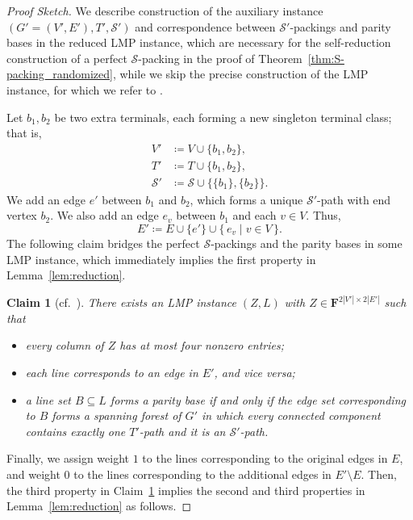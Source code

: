 \documentclass[11pt, a4paper]{article}
\theoremstyle{plain}
\newtheorem{claim}[theorem]{Claim}
\theoremstyle{definition}
\theoremstyle{remark}
\newcommand{\cS}{\mathcal{S}}
\newcommand{\bF}{\mathbf{F}}
\begin{document}
\begin{proof}[Proof Sketch]
We describe construction of the auxiliary instance $(G' = (V', E'), T', \cS')$ and correspondence between $\cS'$-packings and parity bases in the reduced LMP instance, which are necessary for the self-reduction construction of a perfect $\cS$-packing in the proof of Theorem~\ref{thm:S-packing_randomized}, while we skip the precise construction of the LMP instance, for which we refer to \cite[Section~2.1]{Yamaguchi2016}.

Let $b_1, b_2$ be two extra terminals, each forming a new singleton terminal class; that is,
\begin{align*}
    V' &\coloneqq V \cup \{b_1, b_2\},\\
    T' &\coloneqq T \cup \{b_1, b_2\},\\
    \cS' &\coloneqq \cS \cup \{\{b_1\}, \{b_2\}\}.
\end{align*}
We add an edge $e'$ between $b_1$ and $b_2$, which forms a unique $\cS'$-path with end vertex $b_2$.
We also add an edge $e_v$ between $b_1$ and each $v \in V$.
Thus,
\[E' \coloneqq E \cup \{e'\} \cup \{\, e_v \mid v \in V \,\}.\]
The following claim bridges the perfect $\cS$-packings and the parity bases in some LMP instance, which immediately implies the first property in Lemma~\ref{lem:reduction}.

\begin{claim}[cf.~{\cite[Lemma~4]{Yamaguchi2016}}]\label{cl:correspondence}
    There exists an LMP instance $(Z, L)$ with $Z \in \bF^{2|V'| \times 2|E'|}$ such that
    \begin{itemize}
    \setlength{\itemsep}{0.5mm}
        \item every column of $Z$ has at most four nonzero entries;
        \item each line corresponds to an edge in $E'$, and vice versa;
        \item a line set $B \subseteq L$ forms a parity base if and only if the edge set corresponding to $B$ forms a spanning forest of $G'$ in which every connected component contains exactly one $T'$-path and it is an $\cS'$-path.
    \end{itemize}
\end{claim}

Finally, we assign weight $1$ to the lines corresponding to the original edges in $E$, and weight $0$ to the lines corresponding to the additional edges in $E' \setminus E$.
Then, the third property in Claim~\ref{cl:correspondence} implies the second and third properties in Lemma~\ref{lem:reduction} as follows.


\end{proof}
\end{document}
